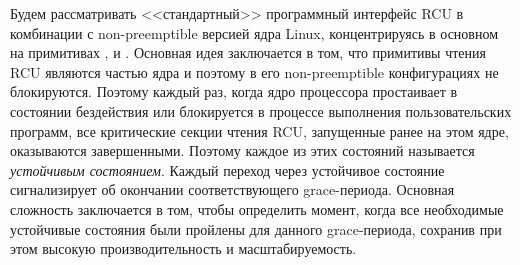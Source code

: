 Будем рассматривать <<стандартный>> программный интерфейс RCU
в комбинации с non-preemptible версией ядра Linux,
концентрируясь в основном на примитивах
,  и .
%
%
%
Основная идея заключается в том, что примитивы чтения RCU являются
частью ядра и поэтому в его non-preemptible конфигурациях не блокируются.
Поэтому каждый раз, когда ядро процессора простаивает в состоянии бездействия
или блокируется в процессе выполнения пользовательских программ,
все критические секции чтения RCU, запущенные ранее на этом ядре,
оказываются завершенными.
Поэтому каждое из этих состояний называется \emph{устойчивым состоянием}.
Каждый переход через устойчивое состояние сигнализирует об
окончании соответствующего grace-периода.
Основная сложность заключается в том, чтобы определить момент,
когда все необходимые устойчивые состояния были пройлены для данного
grace-периода, сохранив при этом высокую производительность и масштабируемость.

